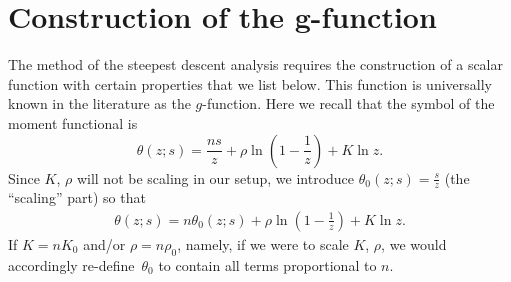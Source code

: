 \documentclass[10pt,a4paper]{amsart}
\numberwithin{equation}{section}
\theoremstyle{definition}
\def\le{\left}
\def\ri{\right}
\begin{document}
\section[Construction of the $g$-function]{Construction of the $\boldsymbol{g}$-function} \label{secgfunction}

 The method of the steepest descent analysis requires the construction of a scalar function with certain properties that we list below. This function is universally known in the literature as the $g$-function.
Here we recall that the symbol of the moment functional is
 \[
 \theta(z;s) = \frac {ns}z + { {\rho}} \ln \le(1-\frac 1 z \ri) + { {K}} \ln z.
 \]
 Since ${ {K}}$, ${ {\rho}}$ will not be scaling in our setup, we introduce $\theta_0(z;s) = \frac s z$ (the ``scaling'' part) so that
 \begin{gather}
 \label{42}
\theta(z;s) = n\theta_0(z;s)+ { {\rho}} \ln \le(1-\frac 1 z \ri) + { {K}} \ln z.
 \end{gather}
 If ${ {K}} = n{ {K}}_0$ and/or ${ {\rho}} = n{ {\rho}}_0$, namely, if we were to scale ${ {K}}$, ${ {\rho}}$, we would accordingly re-define~$\theta_0$ to contain all terms proportional to $n$.
\end{document}
